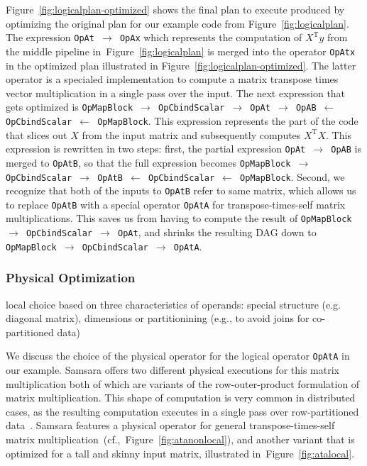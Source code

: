 \documentclass{article}
\begin{document}
Figure~\ref{fig:logicalplan-optimized} shows the final plan to execute produced by optimizing the original plan for our example code from Figure~\ref{fig:logicalplan}. The expression \texttt{OpAt $\rightarrow$ OpAx} which represents the computation of $X^\mathrm{T}y$ from the middle pipeline in~Figure~\ref{fig:logicalplan} is merged into the operator \texttt{OpAtx} in the optimized plan illustrated in Figure~\ref{fig:logicalplan-optimized}. The latter operator is a specialed implementation to compute a matrix transpose times vector multiplication in a single pass over the input. The next expression that gets optimized is \texttt{OpMapBlock $\rightarrow$ OpCbindScalar $\rightarrow$ OpAt $\rightarrow$ OpAB $\leftarrow$ OpCbindScalar $\leftarrow$ OpMapBlock}. This expression represents the part of the code that slices out $X$ from the input matrix and subsequently computes $X^\mathrm{T}X$. This expression is rewritten in two steps: first, the partial expression \texttt{OpAt $\rightarrow$ OpAB} is merged to \texttt{OpAtB}, so that the full expression becomes \texttt{OpMapBlock $\rightarrow$ OpCbindScalar $\rightarrow$ OpAtB $\leftarrow$ OpCbindScalar $\leftarrow$ OpMapBlock}. Second, we recognize that both of the inputs to \texttt{OpAtB} refer to same matrix, which allows us to replace \texttt{OpAtB} with a special operator \texttt{OpAtA} for transpose-times-self matrix multiplications. This saves us from having to compute the result of \texttt{OpMapBlock $\rightarrow$ OpCbindScalar $\rightarrow$ OpAt}, and shrinks the resulting DAG down to \texttt{OpMapBlock $\rightarrow$ OpCbindScalar $\rightarrow$ OpAtA}.

\subsubsection{Physical Optimization}

local choice based on three characteristics of operands: special structure (e.g. diagonal matrix), dimensions or partitionining (e.g., to avoid joins for co-partitioned data)

We discuss the choice of the physical operator for the logical operator \texttt{OpAtA} in our example. Samsara offers two different physical executions for this matrix multiplication both of which are variants of the row-outer-product formulation of matrix multiplication. This shape of computation is very common in distributed cases, as the resulting computation executes in a single pass over row-partitioned data~\cite{Schelter2012}. Samsara features a physical operator for general transpose-times-self matrix multiplication~(cf.,~Figure~\ref{fig:atanonlocal}), and another variant that is optimized for a tall and skinny input matrix, illustrated in~Figure~\ref{fig:atalocal}.
\end{document}
